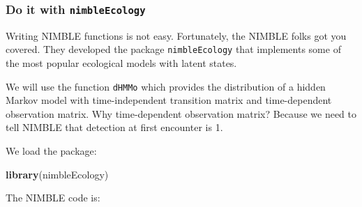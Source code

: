 \documentclass[
  12pt,
]{krantz}
\newenvironment{Shaded}{\begin{snugshade}}{\end{snugshade}}
\newcommand{\FunctionTok}[1]{\textcolor[rgb]{0.13,0.29,0.53}{\textbf{#1}}}
\newcommand{\NormalTok}[1]{#1}
\begin{document}
\subsubsection{\texorpdfstring{Do it with \texttt{nimbleEcology}}{Do it with nimbleEcology}}\label{nimbleecologyintro}

Writing NIMBLE functions is not easy. Fortunately, the NIMBLE folks got you covered. They developed the package \texttt{nimbleEcology} that implements some of the most popular ecological models with latent states.

We will use the function \texttt{dHMMo} which provides the distribution of a hidden Markov model with time-independent transition matrix and time-dependent observation matrix. Why time-dependent observation matrix? Because we need to tell NIMBLE that detection at first encounter is 1.

We load the package:

\begin{Shaded}
\begin{Highlighting}[]
\FunctionTok{library}\NormalTok{(nimbleEcology)}
\end{Highlighting}
\end{Shaded}

The NIMBLE code is:
\end{document}
